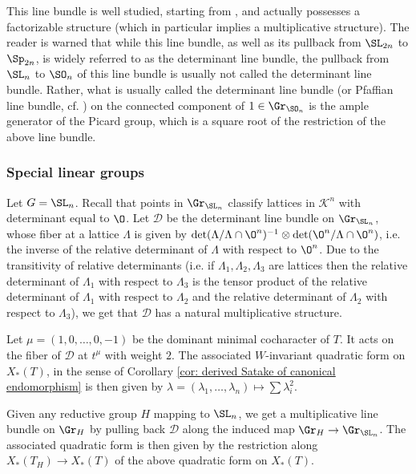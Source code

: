 \documentclass[11pt]{article}
\begin{document}
\begin{appendices}
This line bundle is well studied, starting from \cite{BD}, and actually possesses a factorizable structure (which in particular implies a multiplicative structure). The reader is warned that while this line bundle, as well as its pullback from $\SL_{2n}$ to $\Sp_{2n}$, is widely referred to as the determinant line bundle, the pullback from $\SL_n$ to $\SO_{n}$ of this line bundle is usually not called the determinant line bundle. Rather, what is usually called the determinant line bundle (or Pfaffian line bundle, cf. \cite{BD}) on the connected component of $1\in \Gr_{\SO_n}$ is the ample generator of the Picard group, which is a square root of the restriction of the above line bundle.
\subsubsection{Special linear groups}
Let $G=\SL_n$. Recall that points in $\Gr_{\SL_n}$ classify lattices in $\mathcal{K}^n$ with determinant equal to $\O$. Let $\mathcal{D}$ be the determinant line bundle on $\Gr_{\SL_n}$, whose fiber at a lattice $\Lambda$ is given by $\det(\Lambda/\Lambda\cap \O^n)^{-1}\otimes \det(\O^n/\Lambda\cap \O^n)$, i.e. the inverse of the relative determinant of $\Lambda$ with respect to $\O^n$. Due to the transitivity of relative determinants (i.e. if $\Lambda_1,\Lambda_2, \Lambda_3$ are lattices then the relative determinant of $\Lambda_1$ with respect to $\Lambda_3$ is the tensor product of the relative determinant of $\Lambda_1$ with respect to $\Lambda_2$ and the relative determinant of $\Lambda_2$ with respect to $\Lambda_3$), we get that $\mathcal{D}$ has a natural multiplicative structure.

Let $\mu=(1,0,\dots, 0, -1)$ be the dominant minimal cocharacter of $T$.
It acts on the fiber of $\mathcal{D}$ at $t^\mu$ with weight $2$. The associated $W$-invariant quadratic form on $X_*(T)$, in the sense of Corollary \ref{cor: derived Satake of canonical endomorphism} is then given by $\lambda=(\lambda_1, \dots, \lambda_n)\mapsto \sum \lambda_i^2$.


Given any reductive group $H$ mapping to $\SL_n$, we get a multiplicative line bundle on $\Gr_H$ by pulling back $\mathcal{D}$ along the induced map $\Gr_H\to \Gr_{\SL_n}$. The associated quadratic form is then given by the restriction along $X_*(T_H)\to X_*(T)$ of the above quadratic form on $X_*(T)$.


\end{appendices}
\end{document}
